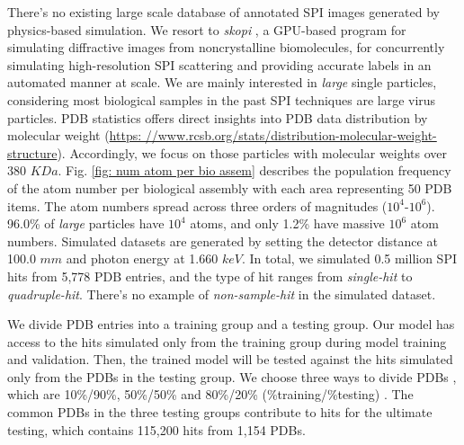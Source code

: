 There's no existing large scale database of annotated SPI images generated by
physics-based simulation.  We resort to \textit{skopi}
\cite{peckSkopiSimulationPackage2022}, a GPU-based program for simulating
diffractive images from noncrystalline biomolecules, for concurrently simulating
high-resolution SPI scattering and providing accurate labels in an automated
manner at scale.  We are mainly interested in \textit{large} single particles,
considering most biological samples in the past SPI techniques are large virus
particles.  PDB statistics offers direct insights into PDB data distribution by
molecular weight (\url{https:
//www.rcsb.org/stats/distribution-molecular-weight-structure}).  Accordingly, we
focus on those particles with molecular weights over 380 $KDa$.  Fig.  \ref{fig:
num atom per bio assem} describes the population frequency of the atom number
per biological assembly with each area representing 50 PDB items.  The atom
numbers spread across three orders of magnitudes ($10^4\text{-}10^6$).  96.0\%
of \textit{large} particles have $10^4$ atoms, and only 1.2\% have massive
$10^6$ atom numbers. Simulated datasets are generated by setting the detector
distance at 100.0 $mm$ and photon energy at 1.660 $keV$.  In total, we simulated
0.5 million SPI hits from 5,778 PDB entries, and the type of hit ranges from
\textit{single-hit} to \textit{quadruple-hit}.  There's no example of
\textit{non-sample-hit} in the simulated dataset.

We divide PDB entries into a training group and a testing group.  Our model has
access to the hits simulated only from the training group during model training
and validation.  Then, the trained model will be tested against the hits
simulated only from the PDBs in the testing group.  We choose three ways to
divide PDBs , which are 10\%/90\%, 50\%/50\% and 80\%/20\% (\%training/\%testing)
.  The common PDBs in the three testing groups contribute to hits for the
ultimate testing, which contains 115,200 hits from 1,154 PDBs.  

